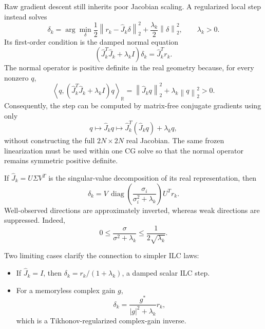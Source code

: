 \documentclass[10pt,a4paper]{article}
\newcommand{\Rinner}[2]{\left\langle #1,#2\right\rangle_{\mathbb R}}
\newcommand{\norm}[1]{\left\lVert #1\right\rVert_2}
\newcommand{\Jhat}{\widehat J}
\begin{document}
Raw gradient descent still inherits poor Jacobian scaling. A regularized local step instead solves
\begin{equation}
  \delta_k
  =\arg\min_\delta
  \frac12\norm{r_k-\Jhat_k\delta}^{2}
  +\frac{\lambda_k}{2}\norm{\delta}^{2},
  \qquad \lambda_k>0.
  \label{eq:lm-objective}
\end{equation}
Its first-order condition is the damped normal equation
\begin{equation}
  \boxed{
  \left(\Jhat_k^T\Jhat_k+\lambda_k I\right)\delta_k
  =\Jhat_k^T r_k.}
  \label{eq:lm-normal-equation}
\end{equation}
The normal operator is positive definite in the real geometry because, for every nonzero $q$,
\begin{equation}
  \Rinner{q}{(\Jhat_k^T\Jhat_k+\lambda_k I)q}
  =\norm{\Jhat_kq}^{2}+\lambda_k\norm{q}^{2}>0.
  \label{eq:normal-spd}
\end{equation}
Consequently, the step can be computed by matrix-free conjugate gradients using only
\begin{equation}
  q\longmapsto\Jhat_kq
  \longmapsto\Jhat_k^T(\Jhat_kq)+\lambda_kq,
\end{equation}
without constructing the full $2N\times2N$ real Jacobian. The same frozen linearization must be used within
one CG solve so that the normal operator remains symmetric positive definite.

If $\Jhat_k=U\Sigma V^T$ is the singular-value decomposition of its real representation, then
\begin{equation}
  \delta_k
  =V\,\operatorname{diag}\!\left(
    \frac{\sigma_i}{\sigma_i^2+\lambda_k}
  \right)U^T r_k.
  \label{eq:lm-svd}
\end{equation}
Well-observed directions are approximately inverted, whereas weak directions are suppressed. Indeed,
\begin{equation}
  0\leq\frac{\sigma}{\sigma^2+\lambda_k}
  \leq\frac{1}{2\sqrt{\lambda_k}}.
\end{equation}

Two limiting cases clarify the connection to simpler ILC laws:
\begin{itemize}
  \item If $\Jhat_k=I$, then $\delta_k=r_k/(1+\lambda_k)$, a damped scalar ILC step.
  \item For a memoryless complex gain $g$,
  \begin{equation}
    \delta_k=\frac{g^*}{|g|^2+\lambda_k}r_k,
  \end{equation}
  which is a Tikhonov-regularized complex-gain inverse.
\end{itemize}
\end{document}
